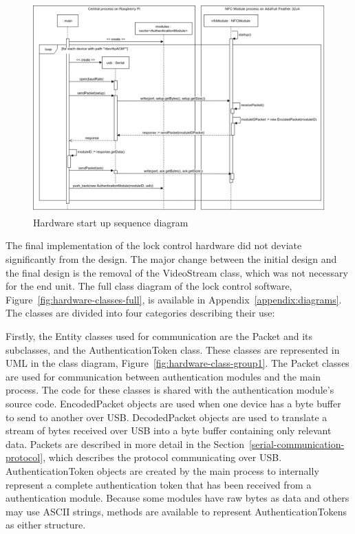 \documentclass[12pt]{report}
\begin{document}
\begin{figure}
    \includegraphics[width=\textwidth]{Diagrams/Hardware-Diagrams/hardware_startup_sequence}
    \caption{Hardware start up sequence diagram}
    \label{fig:hardware-startup-sequence}
\end{figure}

The final implementation of the lock control hardware did not deviate significantly from the design. The major change 
between the initial design and the final design is the removal of the VideoStream class, which was not necessary for 
the end unit. The full class diagram of the lock control software, Figure~\ref{fig:hardware-classes-full}, is available 
in Appendix~\ref{appendix:diagrams}. The classes are divided into four categories describing their use:

Firstly, the Entity classes used for communication are the Packet and its subclasses, and the AuthenticationToken 
class. These classes are represented in UML in the class diagram, Figure~\ref{fig:hardware-class-group1}.
The Packet classes are used for communication between authentication modules and the main process. The code for 
these classes is shared with the authentication module's source code. EncodedPacket objects are used when one device 
has a byte buffer to send to another over USB. DecodedPacket objects are used to translate a stream of bytes received 
over USB into a byte buffer containing only relevant data. Packets are described in more detail in the 
Section~\ref{serial-communication-protocol}, which describes the protocol communicating over USB. AuthenticationToken 
objects are created by the main process to internally represent a complete authentication token that has been received 
from a authentication module. Because some modules have raw bytes as data and others may use ASCII strings, methods are 
available to represent AuthenticationTokens as either structure.
\end{document}
